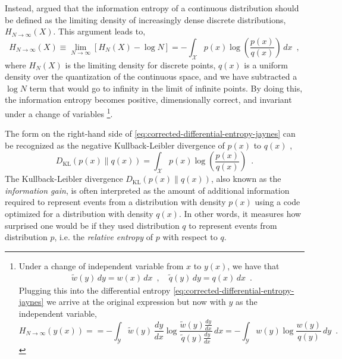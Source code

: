 Instead, \textcite{jaynes_information_1957,jaynes_prior_1968} argued that the information entropy of a continuous distribution should be defined as the limiting density of increasingly dense discrete distributions, $H_{N\rightarrow\infty}(X)$. This argument leads to,
%
\begin{equation} \label{eq:corrected-differential-entropy-jaynes}
    H_{N\rightarrow\infty}(X) \equiv \lim_{N\rightarrow\infty} [H_{N}(X) - \log N] = - \int_{\mathcal{X}} p(x) \log \left(\frac{p(x)}{q(x)}\right) \, dx \enspace ,
\end{equation}
%
where $H_N(X)$ is the limiting density for discrete points, $q(x)$ is a uniform density over the quantization of the continuous space, and we have subtracted a $\log N$ term that would go to infinity in the limit of infinite points.
By doing this, the information entropy becomes positive, dimensionally correct, and invariant under a change of variables%
\footnote{\label{fn:change-of-variables-invariance-of-corrected-differential-entropy}
    Under a change of independent variable from $x$ to $y(x)$, we have that
    \begin{align*}
        \widetilde{w}(y)\,dy = w(x)\,dx \enspace , \quad
        \widetilde{q}(y)\,dy = q(x)\,dx \enspace .
    \end{align*}
    Plugging this into the differential entropy \cref{eq:corrected-differential-entropy-jaynes} we arrive at the original expression but now with $y$ as the independent variable,
    \begin{equation*}
        H_{N\rightarrow\infty}(y(x)) =  = - \int_{\mathcal{Y}} \widetilde{w}(y)\,\frac{dy}{dx} \log \frac{\widetilde{w}(y)\frac{dy}{dx}}{\widetilde{q}(y)\frac{dy}{dx}} \, dx = - \int_{\mathcal{Y}} w(y) \log \frac{w(y)}{q(y)} \, dy \enspace .
    \end{equation*}
}.

The form on the right-hand side of \cref{eq:corrected-differential-entropy-jaynes} can be recognized as the negative Kullback-Leibler divergence of $p(x)$ to $q(x)$ \parencite{kullback_information_1959},
%
\begin{equation} \label{eq:kullback-leibler-divergence}
    D_{\mathrm{KL}}(p(x)\parallel q(x)) = \int_{\mathcal{X}} p(x) \log \left(\frac{p(x)}{q(x)}\right) \enspace .
\end{equation}
%
The Kullback-Leibler divergence $D_{\mathrm{KL}}(p(x)\parallel q(x))$, also known as the \emph{information gain}, is often interpreted as the amount of additional information required to represent events from a distribution with density $p(x)$ using a code optimized for a distribution with density $q(x)$. In other words, it measures how surprised one would be if they used distribution $q$ to represent events from distribution $p$, i.e. the \emph{relative entropy} of $p$ with respect to $q$.

